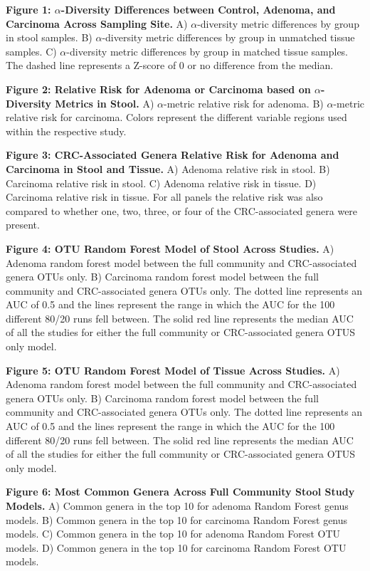 \documentclass[12pt,]{article}
\begin{document}
\normalsize
\newpage

\textbf{Figure 1: \(\alpha\)-Diversity Differences between Control,
Adenoma, and Carcinoma Across Sampling Site.} A) \(\alpha\)-diversity
metric differences by group in stool samples. B) \(\alpha\)-diversity
metric differences by group in unmatched tissue samples. C)
\(\alpha\)-diversity metric differences by group in matched tissue
samples. The dashed line represents a Z-score of 0 or no difference from
the median.

\textbf{Figure 2: Relative Risk for Adenoma or Carcinoma based on
\(\alpha\)-Diversity Metrics in Stool.} A) \(\alpha\)-metric relative
risk for adenoma. B) \(\alpha\)-metric relative risk for carcinoma.
Colors represent the different variable regions used within the
respective study.

\textbf{Figure 3: CRC-Associated Genera Relative Risk for Adenoma and
Carcinoma in Stool and Tissue.} A) Adenoma relative risk in stool. B)
Carcinoma relative risk in stool. C) Adenoma relative risk in tissue. D)
Carcinoma relative risk in tissue. For all panels the relative risk was
also compared to whether one, two, three, or four of the CRC-associated
genera were present.

\textbf{Figure 4: OTU Random Forest Model of Stool Across Studies.} A)
Adenoma random forest model between the full community and
CRC-associated genera OTUs only. B) Carcinoma random forest model
between the full community and CRC-associated genera OTUs only. The
dotted line represents an AUC of 0.5 and the lines represent the range
in which the AUC for the 100 different 80/20 runs fell between. The
solid red line represents the median AUC of all the studies for either
the full community or CRC-associated genera OTUS only model.

\textbf{Figure 5: OTU Random Forest Model of Tissue Across Studies.} A)
Adenoma random forest model between the full community and
CRC-associated genera OTUs only. B) Carcinoma random forest model
between the full community and CRC-associated genera OTUs only. The
dotted line represents an AUC of 0.5 and the lines represent the range
in which the AUC for the 100 different 80/20 runs fell between. The
solid red line represents the median AUC of all the studies for either
the full community or CRC-associated genera OTUS only model.

\textbf{Figure 6: Most Common Genera Across Full Community Stool Study
Models.} A) Common genera in the top 10 for adenoma Random Forest genus
models. B) Common genera in the top 10 for carcinoma Random Forest genus
models. C) Common genera in the top 10 for adenoma Random Forest OTU
models. D) Common genera in the top 10 for carcinoma Random Forest OTU
models.
\end{document}
